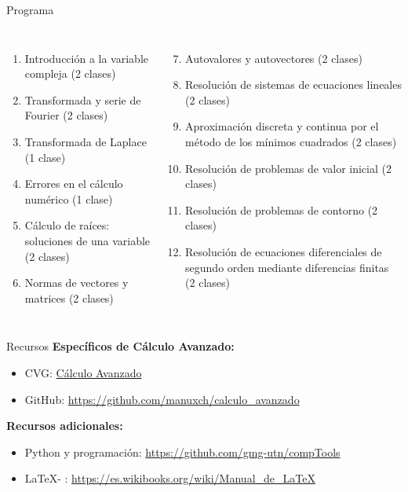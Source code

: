 \documentclass[9pt, aspectratio=169]{beamer}
\begin{document}
\begin{frame}{Programa}
	\begin{columns}[t]
		\cx
		\begin{enumerate}
			\item Introducción a la variable compleja (2 clases)
			\item Transformada y serie de Fourier (2 clases)
			\item Transformada de Laplace (1 clase)
			\item Errores en el cálculo numérico (1 clase)
			\item Cálculo de raíces: soluciones de una variable (2 clases)
			\item Normas de vectores y matrices (2 clases)
		\end{enumerate}
		\cx
		\begin{enumerate}
			\setcounter{enumi}{6}
			\item Autovalores y autovectores (2 clases)
			\item Resolución de sistemas de ecuaciones lineales (2 clases)
			\item Aproximación discreta y continua por el método de los mínimos cuadrados (2 clases)
			\item Resolución de problemas de valor inicial (2 clases)
			\item Resolución de problemas de contorno (2 clases)
			\item Resolución de ecuaciones diferenciales de segundo orden mediante diferencias finitas (2 clases)
		\end{enumerate}
	\end{columns}
	\vspace{1em}
	\begin{columns}[c]
		\cx
		\centering

		\cx
		\centering
	\end{columns}
\end{frame}

\begin{frame}{Recursos}
	\textbf{Específicos de Cálculo Avanzado:}
	\begin{itemize}
		\item CVG: \href{https://frlp.cvg.utn.edu.ar/course/view.php?id=189}{Cálculo Avanzado}
		\item GitHub: \url{https://github.com/manuxch/calculo_avanzado}
	\end{itemize}

	\textbf{Recursos adicionales:}
	\begin{itemize}
		\item Python y programación: \url{https://github.com/gmg-utn/compTools}
		\item \LaTeX - \XeLaTeX: \url{https://es.wikibooks.org/wiki/Manual_de_LaTeX}
	\end{itemize}
\end{frame}
\end{document}
